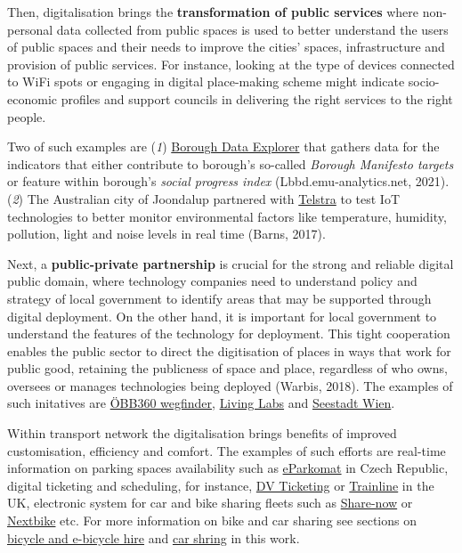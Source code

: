 \documentclass[
]{book}
\begin{document}
Then, digitalisation brings the \textbf{transformation of public services} where non-personal data collected from public spaces is used to better understand the users of public spaces and their needs to improve the cities' spaces, infrastructure and provision of public services. For instance, looking at the type of devices connected to WiFi spots or engaging in digital place-making scheme might indicate socio-economic profiles and support councils in delivering the right services to the right people.

Two of such examples are (\emph{1}) \href{https://lbbd.emu-analytics.net/main/(view/950db2c7-1a3b-448d-9b21-444a0ec7b5e0//rightBar:appinfo)?basemapDetail=1\&zoom=5.0\&lng=-0.36613\&lat=54.04187}{Borough Data Explorer} that gathers data for the indicators that either contribute to borough's so-called \emph{Borough Manifesto targets} or feature within borough's \emph{social progress index} (Lbbd.emu-analytics.net, 2021). (\emph{2}) The Australian city of Joondalup partnered with \href{https://www.lakesidejoondalup.com.au/store-directory/telstra-shop/}{Telstra} to test IoT technologies to better monitor environmental factors like temperature, humidity, pollution, light and noise levels in real time (Barns, 2017).

Next, a \textbf{public-private partnership} is crucial for the strong and reliable digital public domain, where technology companies need to understand policy and strategy of local government to identify areas that may be supported through digital deployment. On the other hand, it is important for local government to understand the features of the technology for deployment. This tight cooperation enables the public sector to direct the digitisation of places in ways that work for public good, retaining the publicness of space and place, regardless of who owns, oversees or manages technologies being deployed (Warbis, 2018). The examples of such initatives are \href{https://wegfinder.at/presse/2021/mit-wegfinder-ist-mobility-as-a-service-in-oesterreich-angekommen(1)/}{ÖBB360 wegfinder}, \href{https://austriatech.at/en/insight-into-the-work-of-the-urban-mobility-laboratories/}{Living Labs} and \href{https://www.aspern-seestadt.at/en}{Seestadt Wien}.

Within transport network the digitalisation brings benefits of improved customisation, efficiency and comfort. The examples of such efforts are real-time information on parking spaces availability such as \href{https://www.eparkomat.com/}{eParkomat} in Czech Republic, digital ticketing and scheduling, for instance, \href{https://www.dv-ticketing.com/}{DV Ticketing} or \href{https://www.thetrainline.com/}{Trainline} in the UK, electronic system for car and bike sharing fleets such as \href{https://www.share-now.com/at/en/}{Share-now} or \href{https://www.nextbike.at/de/niederoesterreich/}{Nextbike} etc. For more information on bike and car sharing see sections on \protect\hyperlink{bike_sharing}{bicycle and e-bicycle hire} and \protect\hyperlink{car_sharing}{car shring} in this work.
\end{document}
